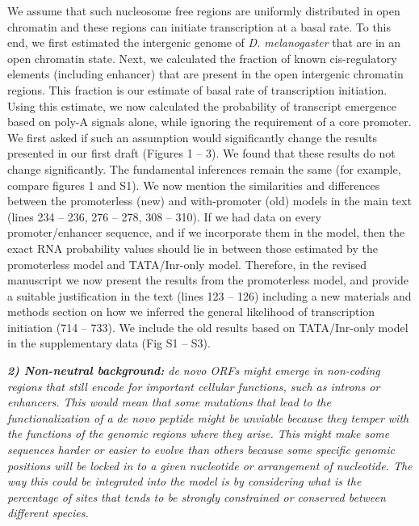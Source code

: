 \documentclass[12pt,a4paper]{article}
\begin{document}
We assume that such nucleosome free regions are uniformly distributed in open chromatin and these regions can initiate transcription at a basal rate. To this end, we first estimated the intergenic genome of \textit{D. melanogaster} that are in an open chromatin state. Next, we calculated the fraction of known cis-regulatory elements (including enhancer) that are present in the open intergenic chromatin regions. This fraction is our estimate of basal rate of transcription initiation. Using this estimate, we now calculated the probability of transcript emergence based on poly-A signals alone, while ignoring the requirement of a core promoter. We first asked if such an assumption would significantly change the results presented in our first draft (Figures 1 -- 3). We found that these results do not change significantly. The fundamental inferences remain the same (for example, compare figures 1 and S1). We now mention the similarities and differences between the promoterless (new) and with-promoter (old) models in the main text (lines 234 -- 236, 276 -- 278, 308 -- 310). If we had data on every promoter/enhancer sequence, and if we incorporate them in the model, then the exact RNA probability values should lie in between those estimated by the promoterless model and TATA/Inr-only model. Therefore, in the revised manuscript we now present the results from the promoterless model, and provide a suitable justification in the text (lines 123 -- 126) including a new materials and methods section on how we inferred the general likelihood of transcription initiation (714 -- 733). We include the old results based on TATA/Inr-only model in the supplementary data (Fig S1 -- S3). 

{\itshape \textbf{2) Non-neutral background:} de novo ORFs might emerge in non-coding regions that still encode for important cellular functions, such as introns or enhancers. This would mean that some mutations that lead to the functionalization of a de novo peptide might be unviable because they temper with the functions of the genomic regions where they arise. This might make some sequences harder or easier to evolve than others because some specific genomic positions will be locked in to a given nucleotide or arrangement of nucleotide. The way this could be integrated into the model is by considering what is the percentage of sites that tends to be strongly constrained or conserved between different species.}
\end{document}
